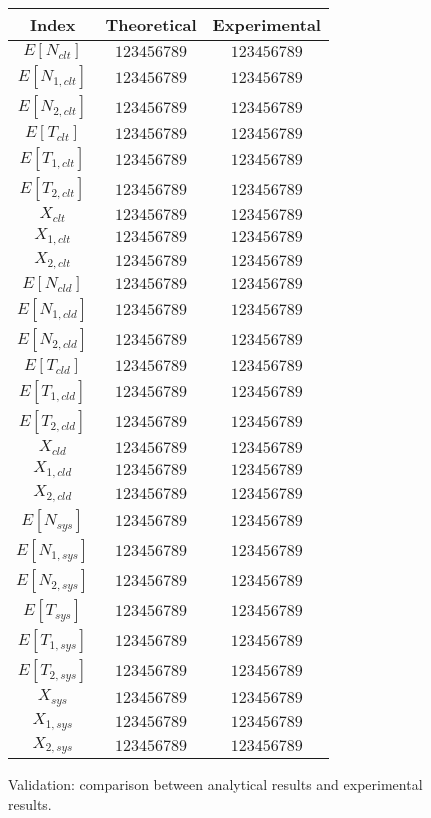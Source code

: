\begin{figure}
	\begin{center}
		\begin{tabular}{|c||c|c|}
			\hline
			Index & Theoretical & Experimental\\
			\hline
			$E[N_{clt}]$  & $123456789$ & $123456789$ \\
			$E[N_{1,clt}]$  & $123456789$ & $123456789$ \\
			$E[N_{2,clt}]$  & $123456789$ & $123456789$ \\
			$E[T_{clt}]$  & $123456789$ & $123456789$ \\
			$E[T_{1,clt}]$  & $123456789$ & $123456789$ \\
			$E[T_{2,clt}]$  & $123456789$ & $123456789$ \\
			$X_{clt}$  & $123456789$ & $123456789$ \\
			$X_{1,clt}$  & $123456789$ & $123456789$ \\
			$X_{2,clt}$  & $123456789$ & $123456789$ \\
			\hline
			$E[N_{cld}]$  & $123456789$ & $123456789$ \\
			$E[N_{1,cld}]$  & $123456789$ & $123456789$ \\
			$E[N_{2,cld}]$  & $123456789$ & $123456789$ \\
			$E[T_{cld}]$  & $123456789$ & $123456789$ \\
			$E[T_{1,cld}]$  & $123456789$ & $123456789$ \\
			$E[T_{2,cld}]$  & $123456789$ & $123456789$ \\
			$X_{cld}$  & $123456789$ & $123456789$ \\
			$X_{1,cld}$  & $123456789$ & $123456789$ \\
			$X_{2,cld}$  & $123456789$ & $123456789$ \\
			\hline
			$E[N_{sys}]$  & $123456789$ & $123456789$ \\
			$E[N_{1,sys}]$  & $123456789$ & $123456789$ \\
			$E[N_{2,sys}]$  & $123456789$ & $123456789$ \\
			$E[T_{sys}]$  & $123456789$ & $123456789$ \\
			$E[T_{1,sys}]$  & $123456789$ & $123456789$ \\
			$E[T_{2,sys}]$  & $123456789$ & $123456789$ \\
			$X_{sys}$  & $123456789$ & $123456789$ \\
			$X_{1,sys}$  & $123456789$ & $123456789$ \\
			$X_{2,sys}$  & $123456789$ & $123456789$ \\
			\hline
		\end{tabular}
	\end{center}
	\caption{Validation: comparison between analytical results and experimental results.}
	\label{tbl:validation}
\end{figure}